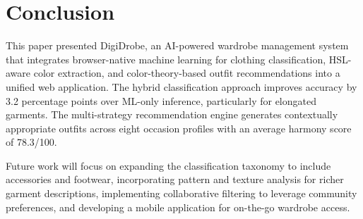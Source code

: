 \documentclass[conference]{IEEEtran}
\begin{document}
\section{Conclusion}

This paper presented DigiDrobe, an AI-powered wardrobe management system that integrates browser-native machine learning for clothing classification, HSL-aware color extraction, and color-theory-based outfit recommendations into a unified web application. The hybrid classification approach improves accuracy by 3.2 percentage points over ML-only inference, particularly for elongated garments. The multi-strategy recommendation engine generates contextually appropriate outfits across eight occasion profiles with an average harmony score of 78.3/100.

Future work will focus on expanding the classification taxonomy to include accessories and footwear, incorporating pattern and texture analysis for richer garment descriptions, implementing collaborative filtering to leverage community preferences, and developing a mobile application for on-the-go wardrobe access.
\end{document}

